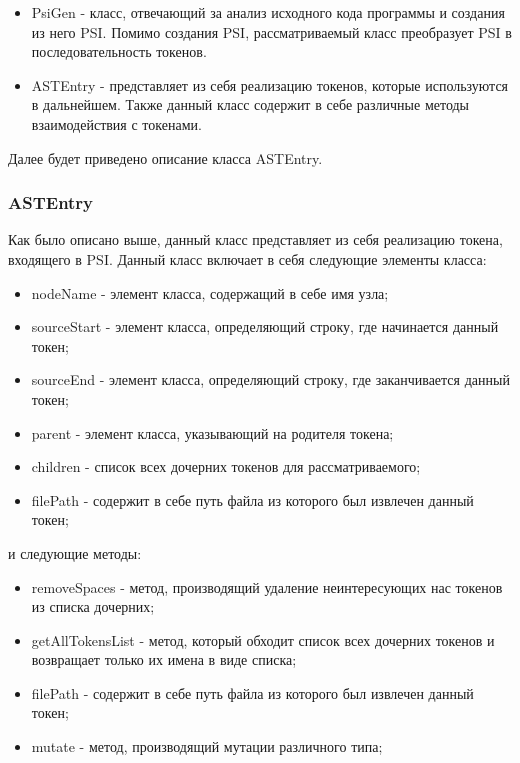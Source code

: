 \begin{itemize}
\setlength\itemsep{0mm}
\item PsiGen - класс, отвечающий за анализ исходного кода программы и создания из него PSI. Помимо создания PSI, рассматриваемый класс преобразует PSI в последовательность токенов.
\item ASTEntry - представляет из себя реализацию токенов, которые используются в дальнейшем. Также данный класс содержит в себе различные методы взаимодействия с токенами.
\end{itemize}


Далее будет приведено описание класса ASTEntry.

\subsubsection{ASTEntry}

Как было описано выше, данный класс представляет из себя реализацию токена, входящего в PSI. Данный класс включает в себя следующие элементы класса:

\begin{itemize}
\setlength\itemsep{0mm}
\item nodeName - элемент класса, содержащий в себе имя узла;
\item sourceStart - элемент класса, определяющий строку, где начинается данный токен;
\item sourceEnd - элемент класса, определяющий строку, где заканчивается данный токен;
\item parent - элемент класса, указывающий на родителя токена;
\item children - список всех дочерних токенов для рассматриваемого;
\item filePath - содержит в себе путь файла из которого был извлечен данный токен;
\end{itemize}

и следующие методы:

\begin{itemize}
\setlength\itemsep{0mm}
\item removeSpaces - метод, производящий удаление неинтересующих нас токенов из списка дочерних;
\item getAllTokensList - метод, который обходит список всех дочерних токенов и возвращает только их имена в виде списка;
\item filePath - содержит в себе путь файла из которого был извлечен данный токен;
\item mutate - метод, производящий мутации различного типа;
\end{itemize}


